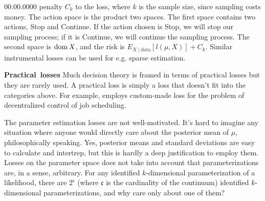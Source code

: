 \begin{lyxlist}{00.00.0000}
penalty $C_{k}$ to the loss, where $k$ is the sample size, since
sampling costs money. The action space is the product two spaces.
The first space contains two actions, Stop and Continue. If the action
chosen is Stop, we will stop our sampling process; if it is Continue,
we will continue the sampling process. The second space is $\operatorname{dom} X$,
and the risk is $E_{X\mid\textrm{data}}[l(\mu,X)]+C_{k}$. Similar
instrumental losses can be used for e.g. sparse estimation.
\item [{\textbf{Practical~losses}}] Much decision theory is framed in
terms of practical losses but they are rarely used. A practical loss
is simply a loss that doesn't fit into the categories above. For example,
\cite{Stankovic1985-th} employs custom-made loss for the problem
of decentralized control of job scheduling. 
\end{lyxlist}
The parameter estimation losses are not well-motivated. It's hard
to imagine any situation where anyone would directly care about the
posterior mean of $\mu$, philosophically speaking. Yes, posterior
means and standard deviations are easy to calculate and intertrep,
but this is hardly a deep justification to employ them. Losses on the parameter space does not take into account that parameterizations are, in a sense, arbitrary. For any identified $k$-dimensional parameterization of a likelihood, there are $2^{\mathfrak{c}}$ (where $\mathfrak{c}$ is the cardinality of the continuum) identified $k$-dimensional parameterizations, and why care only about one of them? 

